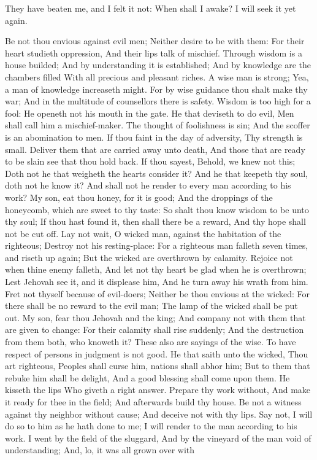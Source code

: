 They have beaten me, and I felt it not: When shall I awake? I will seek it yet again. 

Be not thou envious against evil men; Neither desire to be with them:  For their heart studieth oppression, And their lips talk of mischief.  Through wisdom is a house builded; And by understanding it is established;  And by knowledge are the chambers filled With all precious and pleasant riches.  A wise man is strong; Yea, a man of knowledge increaseth might.  For by wise guidance thou shalt make thy war; And in the multitude of counsellors there is safety.  Wisdom is too high for a fool: He openeth not his mouth in the gate.  He that deviseth to do evil, Men shall call him a mischief-maker.  The thought of foolishness is sin; And the scoffer is an abomination to men.  If thou faint in the day of adversity, Thy strength is small.  Deliver them that are carried away unto death, And those that are ready to be slain see that thou hold back.  If thou sayest, Behold, we knew not this; Doth not he that weigheth the hearts consider it? And he that keepeth thy soul, doth not he know it? And shall not he render to every man according to his work?  My son, eat thou honey, for it is good; And the droppings of the honeycomb, which are sweet to thy taste:  So shalt thou know wisdom to be unto thy soul; If thou hast found it, then shall there be a reward, And thy hope shall not be cut off.  Lay not wait, O wicked man, against the habitation of the righteous; Destroy not his resting-place:  For a righteous man falleth seven times, and riseth up again; But the wicked are overthrown by calamity.  Rejoice not when thine enemy falleth, And let not thy heart be glad when he is overthrown;  Lest Jehovah see it, and it displease him, And he turn away his wrath from him.  Fret not thyself because of evil-doers; Neither be thou envious at the wicked:  For there shall be no reward to the evil man; The lamp of the wicked shall be put out.  My son, fear thou Jehovah and the king; And company not with them that are given to change:  For their calamity shall rise suddenly; And the destruction from them both, who knoweth it?  These also are sayings of the wise. To have respect of persons in judgment is not good.  He that saith unto the wicked, Thou art righteous, Peoples shall curse him, nations shall abhor him;  But to them that rebuke him shall be delight, And a good blessing shall come upon them.  He kisseth the lips Who giveth a right answer.  Prepare thy work without, And make it ready for thee in the field; And afterwards build thy house.  Be not a witness against thy neighbor without cause; And deceive not with thy lips.  Say not, I will do so to him as he hath done to me; I will render to the man according to his work.  I went by the field of the sluggard, And by the vineyard of the man void of understanding;  And, lo, it was all grown over with 